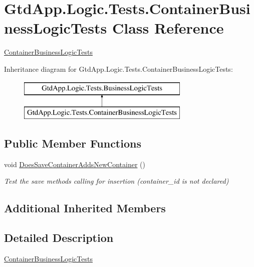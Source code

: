 \hypertarget{class_gtd_app_1_1_logic_1_1_tests_1_1_container_business_logic_tests}{}\section{Gtd\+App.\+Logic.\+Tests.\+Container\+Business\+Logic\+Tests Class Reference}
\label{class_gtd_app_1_1_logic_1_1_tests_1_1_container_business_logic_tests}


\mbox{\hyperlink{class_gtd_app_1_1_logic_1_1_tests_1_1_container_business_logic_tests}{Container\+Business\+Logic\+Tests}}  


Inheritance diagram for Gtd\+App.\+Logic.\+Tests.\+Container\+Business\+Logic\+Tests\+:\begin{figure}[H]
\begin{center}
\leavevmode
\includegraphics[height=2.000000cm]{class_gtd_app_1_1_logic_1_1_tests_1_1_container_business_logic_tests}
\end{center}
\end{figure}
\subsection*{Public Member Functions}
\begin{DoxyCompactItemize}
\item 
void \mbox{\hyperlink{class_gtd_app_1_1_logic_1_1_tests_1_1_container_business_logic_tests_a51e46256b82148f9a33a616daa5b551c}{Does\+Save\+Container\+Adds\+New\+Container}} ()
\begin{DoxyCompactList}\small\item\em Test the save method\textquotesingle{}s calling for insertion (container\+\_\+id is not declared) \end{DoxyCompactList}\end{DoxyCompactItemize}
\subsection*{Additional Inherited Members}


\subsection{Detailed Description}
\mbox{\hyperlink{class_gtd_app_1_1_logic_1_1_tests_1_1_container_business_logic_tests}{Container\+Business\+Logic\+Tests}} 



